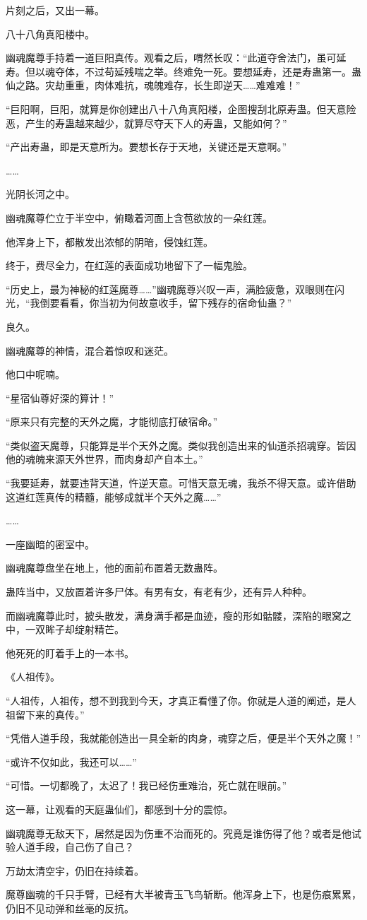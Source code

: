 \begin{this_body}
片刻之后，又出一幕。

八十八角真阳楼中。

幽魂魔尊手持着一道巨阳真传。观看之后，喟然长叹：“此道夺舍法门，虽可延寿。但以魂夺体，不过苟延残喘之举。终难免一死。要想延寿，还是寿蛊第一。蛊仙之路。灾劫重重，肉体难抗，魂魄难存，长生即逆天……难难难！”

“巨阳啊，巨阳，就算是你创建出八十八角真阳楼，企图搜刮北原寿蛊。但天意险恶，产生的寿蛊越来越少，就算尽夺天下人的寿蛊，又能如何？”

“产出寿蛊，即是天意所为。要想长存于天地，关键还是天意啊。”

……

光阴长河之中。

幽魂魔尊伫立于半空中，俯瞰着河面上含苞欲放的一朵红莲。

他浑身上下，都散发出浓郁的阴暗，侵蚀红莲。

终于，费尽全力，在红莲的表面成功地留下了一幅鬼脸。

“历史上，最为神秘的红莲魔尊……”幽魂魔尊兴叹一声，满脸疲惫，双眼则在闪光，“我倒要看看，你当初为何故意收手，留下残存的宿命仙蛊？”

良久。

幽魂魔尊的神情，混合着惊叹和迷茫。

他口中呢喃。

“星宿仙尊好深的算计！”

“原来只有完整的天外之魔，才能彻底打破宿命。”

“类似盗天魔尊，只能算是半个天外之魔。类似我创造出来的仙道杀招魂穿。皆因他的魂魄来源天外世界，而肉身却产自本土。”

“我要延寿，就要违背天道，忤逆天意。可惜天意无魂，我杀不得天意。或许借助这道红莲真传的精髓，能够成就半个天外之魔……”

……

一座幽暗的密室中。

幽魂魔尊盘坐在地上，他的面前布置着无数蛊阵。

蛊阵当中，又放置着许多尸体。有男有女，有老有少，还有异人种种。

而幽魂魔尊此时，披头散发，满身满手都是血迹，瘦的形如骷髅，深陷的眼窝之中，一双眸子却绽射精芒。

他死死的盯着手上的一本书。

《人祖传》。

“人祖传，人祖传，想不到我到今天，才真正看懂了你。你就是人道的阐述，是人祖留下来的真传。”

“凭借人道手段，我就能创造出一具全新的肉身，魂穿之后，便是半个天外之魔！”

“或许不仅如此，我还可以……”

“可惜。一切都晚了，太迟了！我已经伤重难治，死亡就在眼前。”

这一幕，让观看的天庭蛊仙们，都感到十分的震惊。

幽魂魔尊无敌天下，居然是因为伤重不治而死的。究竟是谁伤得了他？或者是他试验人道手段，自己伤了自己？

万劫太清空宇，仍旧在持续着。

魔尊幽魂的千只手臂，已经有大半被青玉飞鸟斩断。他浑身上下，也是伤痕累累，仍旧不见动弹和丝毫的反抗。

\end{this_body}


